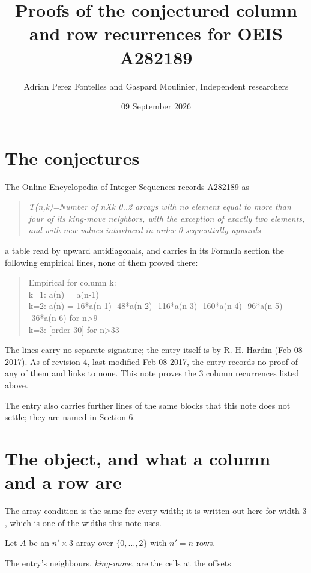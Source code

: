 \documentclass[11pt]{article}
\title{Proofs of the conjectured column and row recurrences for OEIS A282189}
\author{Adrian Perez Fontelles and Gaspard Moulinier, Independent researchers}
\date{09 September 2026}
\theoremstyle{definition}
\begin{document}
\maketitle
\section{The conjectures}

The Online Encyclopedia of Integer Sequences records \href{https://oeis.org/A282189}{A282189} as

\begin{quote}\itshape T(n,k)=Number of nXk 0..2 arrays with no element equal to more than four of its king-move neighbors, with the exception of exactly two elements, and with new values introduced in order 0 sequentially upwards\end{quote}

a table read by upward antidiagonals, and carries in its Formula section the following empirical lines, none of them proved there:

\begin{quote}\ttfamily Empirical for column k:\\
k=1: a(n) = a(n-1)\\k=2: a(n) = 16*a(n-1) -48*a(n-2) -116*a(n-3) -160*a(n-4) -96*a(n-5) -36*a(n-6) for n>9\\k=3: [order 30] for n>33\end{quote}

The lines carry no separate signature; the entry itself is by R. H. Hardin (Feb 08 2017). As of revision 4, last modified Feb 08 2017, the entry records no proof of any of them and links to none. This note proves the 3 column recurrences listed above.

The entry also carries further lines of the same blocks that this note does not settle; they are named in Section 6.

\section{The object, and what a column and a row are}

The array condition is the same for every width; it is written out here for width $3$, which is one of the widths this note uses.

Let $A$ be an $n' \times 3$ array over $\{0,\dots,2\}$ with $n' = n$ rows.

The entry's neighbours, {\itshape king-move}, are the cells at the offsets
\end{document}
